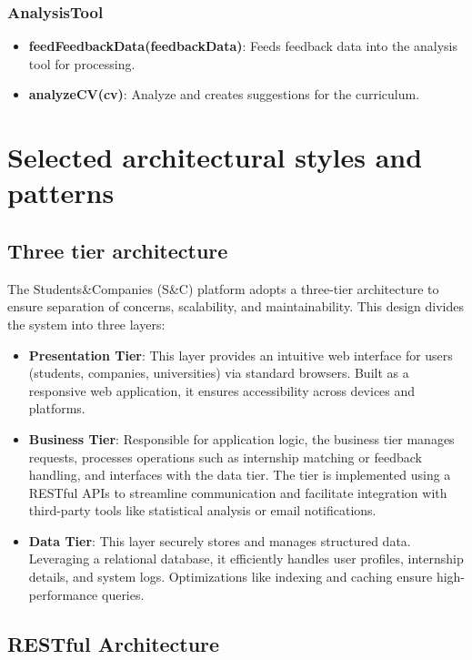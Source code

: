 \subsubsection{AnalysisTool}
\begin{itemize}
    \item \textbf{feedFeedbackData(feedbackData)}: Feeds feedback data into the analysis tool for processing.
    \item \textbf{analyzeCV(cv)}: Analyze and creates suggestions for the curriculum.
\end{itemize}


\section{Selected architectural styles and patterns}
    \subsection{Three tier architecture}

        The Students\&Companies (S\&C) platform adopts a three-tier architecture to ensure separation of concerns, scalability, and maintainability. This design divides the system into three layers:

        \begin{itemize}
            \item \textbf{Presentation Tier}: This layer provides an intuitive web interface for users (students, companies, universities) via standard browsers. Built as a responsive web application, it ensures accessibility across devices and platforms.
            \item \textbf{Business Tier}: Responsible for application logic, the business tier manages requests, processes operations such as internship matching or feedback handling, and interfaces with the data tier. The tier is implemented using a RESTful APIs to streamline communication and facilitate integration with third-party tools like statistical analysis or email notifications.
            \item \textbf{Data Tier}: This layer securely stores and manages structured data. Leveraging a relational database, it efficiently handles user profiles, internship details, and system logs. Optimizations like indexing and caching ensure high-performance queries.
        \end{itemize}

    \subsection{RESTful Architecture}

